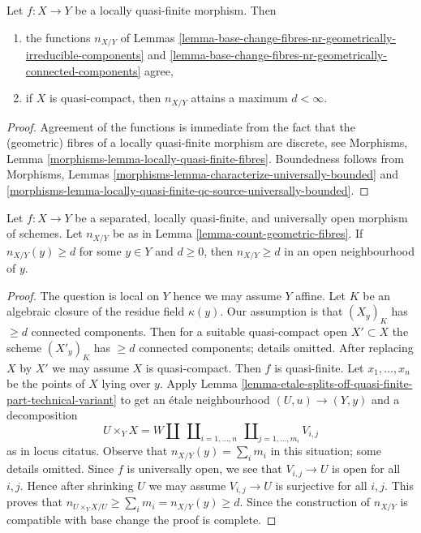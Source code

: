 \begin{lemma}
\label{lemma-count-geometric-fibres}
Let $f : X \to Y$ be a locally quasi-finite morphism. Then
\begin{enumerate}
\item the functions $n_{X/Y}$ of
Lemmas \ref{lemma-base-change-fibres-nr-geometrically-irreducible-components}
and \ref{lemma-base-change-fibres-nr-geometrically-connected-components}
agree,
\item if $X$ is quasi-compact, then $n_{X/Y}$ attains a maximum $d < \infty$.
\end{enumerate}
\end{lemma}

\begin{proof}
Agreement of the functions is immediate from the fact that the
(geometric) fibres of a locally quasi-finite morphism are discrete, see
Morphisms, Lemma \ref{morphisms-lemma-locally-quasi-finite-fibres}.
Boundedness follows from
Morphisms, Lemmas \ref{morphisms-lemma-characterize-universally-bounded} and
\ref{morphisms-lemma-locally-quasi-finite-qc-source-universally-bounded}.
\end{proof}

\begin{lemma}
\label{lemma-count-geometric-fibres-universally-open}
Let $f : X \to Y$ be a separated, locally quasi-finite, and universally open
morphism of schemes. Let $n_{X/Y}$ be as in
Lemma \ref{lemma-count-geometric-fibres}.
If $n_{X/Y}(y) \geq d$ for some $y \in Y$ and $d \geq 0$,
then $n_{X/Y} \geq d$ in an open neighbourhood of $y$.
\end{lemma}

\begin{proof}
The question is local on $Y$ hence we may assume $Y$ affine.
Let $K$ be an algebraic closure of the residue field $\kappa(y)$.
Our assumption is that $(X_y)_K$ has $\geq d$ connected components.
Then for a suitable quasi-compact open $X' \subset X$
the scheme $(X'_y)_K$ has $\geq d$ connected components; details omitted.
After replacing $X$ by $X'$ we may assume $X$ is quasi-compact.
Then $f$ is quasi-finite. Let $x_1, \ldots, x_n$ be the points of $X$
lying over $y$. Apply
Lemma \ref{lemma-etale-splits-off-quasi-finite-part-technical-variant}
to get an \'etale neighbourhood $(U, u) \to (Y, y)$ and a decomposition
$$
U \times_Y X =
W \amalg
\ \coprod\nolimits_{i = 1, \ldots, n}
\ \coprod\nolimits_{j = 1, \ldots, m_i}
V_{i, j}
$$
as in locus citatus. Observe that $n_{X/Y}(y) = \sum_i m_i$
in this situation; some details omitted.
Since $f$ is universally open, we see
that $V_{i, j} \to U$ is open for all $i, j$. Hence after shrinking
$U$ we may assume $V_{i, j} \to U$ is surjective
for all $i, j$. This proves that
$n_{U \times_Y X/U} \geq \sum_i m_i = n_{X/Y}(y) \geq d$.
Since the construction of $n_{X/Y}$ is compatible with
base change the proof is complete.
\end{proof}

